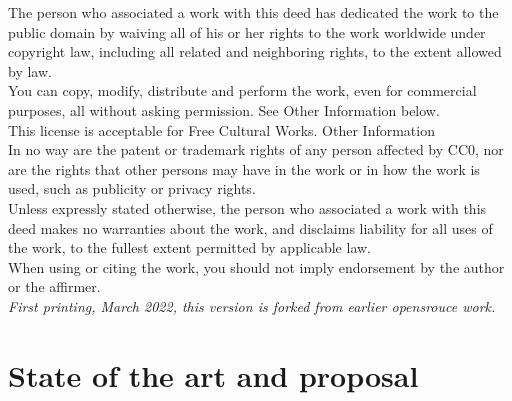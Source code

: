 \documentclass[
	12pt, %
	fleqn, %
	a4paper, %
	oneside, %
]{LegrandOrangeBook}
\begin{document}
\noindent The person who associated a work with this deed has dedicated the work to the public domain by waiving all of his or her rights to the work worldwide under copyright law, including all related and neighboring rights, to the extent allowed by law.\\
You can copy, modify, distribute and perform the work, even for commercial purposes, all without asking permission. See Other Information below.\\
This license is acceptable for Free Cultural Works.
Other Information\\
In no way are the patent or trademark rights of any person affected by CC0, nor are the rights that other persons may have in the work or in how the work is used, such as publicity or privacy rights.\\
Unless expressly stated otherwise, the person who associated a work with this deed makes no warranties about the work, and disclaims liability for all uses of the work, to the fullest extent permitted by applicable law.\\
When using or citing the work, you should not imply endorsement by the author or the affirmer.\\

\noindent \textit{First printing, March 2022, this version is forked from earlier opensrouce work.} %


\pagestyle{empty} %

\tableofcontents %

\listoffigures %

\listoftables %

\pagestyle{fancy} %

\cleardoublepage %


\part{State of the art and proposal}
\end{document}
